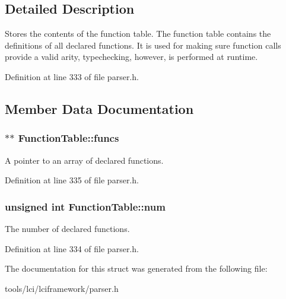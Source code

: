 \subsection{Detailed Description}
Stores the contents of the function table. The function table contains the definitions of all declared functions. It is used for making sure function calls provide a valid arity, typechecking, however, is performed at runtime. 

Definition at line 333 of file parser.\-h.



\subsection{Member Data Documentation}
\hypertarget{struct_function_table_a1c1544bb6db2f638619e21fc60ca2ba8}{
\subsubsection[{funcs}]{$\ast$$\ast$ {\bf Function\-Table\-::funcs}}}\label{struct_function_table_a1c1544bb6db2f638619e21fc60ca2ba8}
A pointer to an array of declared functions. 

Definition at line 335 of file parser.\-h.

\hypertarget{struct_function_table_a568ae3641aaf56327da625e668c4aa51}{
\subsubsection[{num}]{\setlength{\rightskip}{0pt plus 5cm}unsigned int {\bf Function\-Table\-::num}}}\label{struct_function_table_a568ae3641aaf56327da625e668c4aa51}
The number of declared functions. 

Definition at line 334 of file parser.\-h.



The documentation for this struct was generated from the following file\-:\begin{DoxyCompactItemize}
\item 
tools/lci/lciframework/parser.\-h\end{DoxyCompactItemize}
